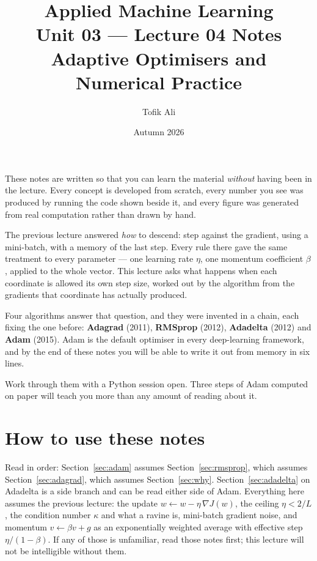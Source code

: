 \documentclass[11pt]{article}
\title{Applied Machine Learning\\Unit 03 --- Lecture 04 Notes\\
       Adaptive Optimisers and Numerical Practice}
\author{Tofik Ali}
\date{Autumn 2026}
\begin{document}
\maketitle

\begin{keyidea}
These notes are written so that you can learn the material \emph{without}
having been in the lecture. Every concept is developed from scratch, every
number you see was produced by running the code shown beside it, and every
figure was generated from real computation rather than drawn by hand.

The previous lecture answered \emph{how} to descend: step against the gradient,
using a mini-batch, with a memory of the last step. Every rule there gave the
same treatment to every parameter --- one learning rate $\eta$, one momentum
coefficient $\beta$, applied to the whole vector. This lecture asks what
happens when each coordinate is allowed its own step size, worked out by the
algorithm from the gradients that coordinate has actually produced.

Four algorithms answer that question, and they were invented in a chain, each
fixing the one before: \textbf{Adagrad} (2011), \textbf{RMSprop} (2012),
\textbf{Adadelta} (2012) and \textbf{Adam} (2015). Adam is the default
optimiser in every deep-learning framework, and by the end of these notes you
will be able to write it out from memory in six lines.

Work through them with a Python session open. Three steps of Adam computed on
paper will teach you more than any amount of reading about it.
\end{keyidea}

\tableofcontents
\newpage

\section{How to use these notes}
\label{sec:how}

Read in order: Section~\ref{sec:adam} assumes Section~\ref{sec:rmsprop}, which
assumes Section~\ref{sec:adagrad}, which assumes Section~\ref{sec:why}.
Section~\ref{sec:adadelta} on Adadelta is a side branch and can be read either
side of Adam. Everything here assumes the previous lecture: the update
$w \leftarrow w - \eta\,\nabla J(w)$, the ceiling $\eta < 2/L$, the condition
number $\kappa$ and what a ravine is, mini-batch gradient noise, and momentum
$v \leftarrow \beta v + g$ as an exponentially weighted average with effective
step $\eta/(1-\beta)$. If any of those is unfamiliar, read those notes first;
this lecture will not be intelligible without them.
\end{document}
